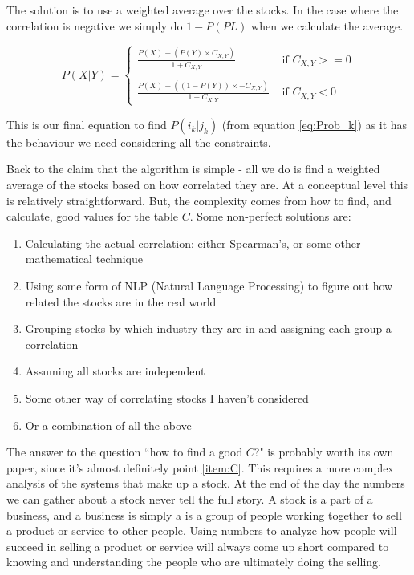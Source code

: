 \documentclass[11pt]{article}
\begin{document}
    The solution is to use a weighted average over the stocks.
    In the case where the correlation is negative we simply do \(1 - P(PL)\)
    when we calculate the average.

    \begin{equation} \label{eq:StockWeight}
        P ( X | Y ) = 
        \begin{cases}
            \displaystyle\frac 
                {P( X ) + (P ( Y ) \times C_{X, Y})}
                {1 + C_{X, Y}} 
                & \text{ if } C_{X, Y} >= 0\\
            \\
            \displaystyle\frac
                {P( X ) + ((1 - P ( Y )) \times - C_{X, Y})}
                {1 - C_{X, Y}} 
                & \text{ if } C_{X, Y} < 0
        \end{cases}
    \end{equation}

    This is our final equation to find \(P(i_k | j_k)\) (from equation \ref{eq:Prob_k})
    as it has the behaviour we need considering all the constraints.

    Back to the claim that the algorithm is simple - all we do is find a
    weighted average of the stocks based on how correlated they are. At a conceptual level
    this is relatively straightforward. But, the complexity comes from how to find, and calculate,
    good values for the table \(C\). Some non-perfect solutions are:

    \begin{enumerate}
        \item{Calculating the actual correlation: either Spearman's, or some other mathematical technique}
        \item{Using some form of NLP (Natural Language Processing) to figure out how related the stocks are in the real world}
        \item{Grouping stocks by which industry they are in and assigning each group a correlation}
        \item{Assuming all stocks are independent}
        \item{Some other way of correlating stocks I haven't considered}
        \item{Or a combination of all the above}\label{item:C}
    \end{enumerate}

    The answer to the question ``how to find a good \(C\)?" is probably worth its own paper, since
    it's almost definitely point \ref{item:C}. This requires a more complex analysis of the systems
    that make up a stock. At the end of the day the numbers we can gather about a stock never
    tell the full story. A stock is a part of a business, and a business is simply a is a
    group of people working together to sell a product or service to other people.
    Using numbers to analyze how people will succeed in selling
    a product or service will always come up short compared to knowing and understanding
    the people who are ultimately doing the selling.
\end{document}
